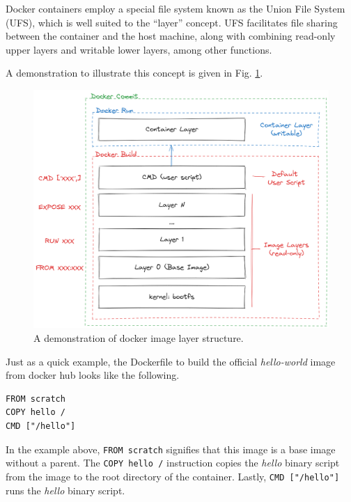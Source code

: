 \begin{shortbox}

Docker containers employ a special file system known as the Union File System (UFS), which is well suited to the ``layer'' concept. UFS facilitates file sharing between the container and the host machine, along with combining read-only upper layers and writable lower layers, among other functions. 

A demonstration to illustrate this concept is given in Fig. \ref{ch:vac:fig:dockerlayerdemo}.

\end{shortbox}

\begin{figure}[!htb]
	\centering
	\includegraphics[width=350pt]{chapters/part-3/figures/dockerlayerdemo.png}
	\caption{A demonstration of docker image layer structure.} \label{ch:vac:fig:dockerlayerdemo}
\end{figure}

Just as a quick example, the Dockerfile to build the official \textit{hello-world} image from docker hub looks like the following.
\begin{lstlisting}
FROM scratch
COPY hello /
CMD ["/hello"]
\end{lstlisting}
In the example above, \verb|FROM scratch| signifies that this image is a base image without a parent. The \verb|COPY hello /| instruction copies the \textit{hello} binary script from the image to the root directory of the container. Lastly, \verb|CMD ["/hello"]| runs the \textit{hello} binary script.

